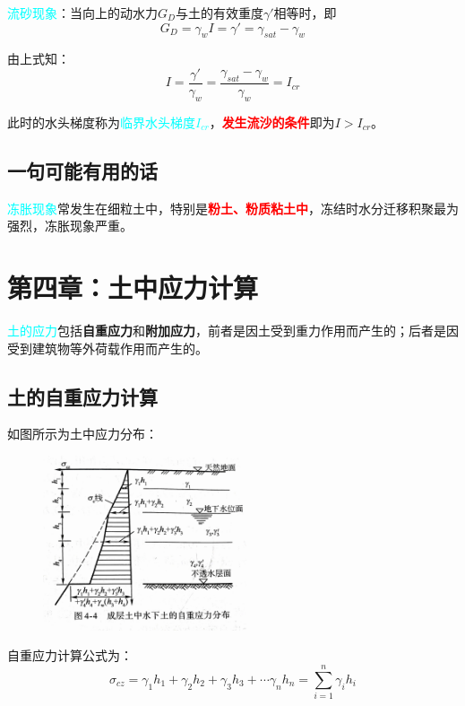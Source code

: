 \documentclass[12pt,a4paper]{ctexart}
\begin{document}
	\textcolor{cyan}{流砂现象}：当向上的动水力$G_D$与土的有效重度$\gamma'$相等时，即
	\begin{equation}
		G_D=\gamma_wI=\gamma'=\gamma_{sat}-\gamma_w
	\end{equation}
	
	由上式知：
	\begin{equation}
		I=\frac{\gamma'}{\gamma_w}=\frac{\gamma_{sat}-\gamma_w}{\gamma_w}=I_{cr}
	\end{equation}

	此时的水头梯度称为\textcolor{cyan}{临界水头梯度$I_{cr}$}，\textcolor{red}{\textbf{发生流沙的条件}}即为$I>I_{cr}$。
	
	\subsection{一句可能有用的话}
	\textcolor{cyan}{冻胀现象}常发生在细粒土中，特别是\textcolor{red}{\textbf{粉土、粉质粘土中}}，冻结时水分迁移积聚最为强烈，冻胀现象严重。
	
	\newpage
	
\section{第四章：土中应力计算}
	\textcolor{cyan}{土的应力}包括\textbf{自重应力}和\textbf{附加应力}，前者是因土受到重力作用而产生的；后者是因受到建筑物等外荷载作用而产生的。
	
	\subsection{土的自重应力计算}
	如图所示为土中应力分布：
	\begin{figure}[h]
		\centering
		\includegraphics[width = 6cm ]{ylfb}
	\end{figure}
	
	自重应力计算公式为：
	\begin{equation}
		\sigma_{cz}=\gamma_1h_1+\gamma_2h_2+\gamma_3h_3+\cdots \gamma_nh_n=\sum_{i=1}^{n} \gamma_ih_i
	\end{equation}
\end{document}

